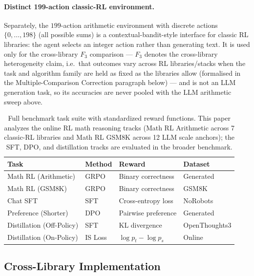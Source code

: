 \paragraph{Distinct 199-action classic-RL environment.}
Separately, the $199$-action arithmetic environment with discrete actions $\{0,\dots,198\}$ (all possible sums) is a contextual-bandit-style interface for classic RL libraries: the agent selects an integer action rather than generating text.
It is used only for the cross-library $F_3$ comparison --- $F_3$ denotes the cross-library heterogeneity claim, i.e.\ that outcomes vary across RL libraries/stacks when the task and algorithm family are held as fixed as the libraries allow (formalised in the Multiple-Comparison Correction paragraph below) --- and is not an LLM generation task, so its accuracies are never pooled with the LLM arithmetic sweep above.

\begin{table}[htbp]
\centering
\caption{Full \ours{} benchmark task suite with standardized reward functions. This paper analyzes the online RL math reasoning tracks (Math RL Arithmetic across 7 classic-RL libraries and Math RL GSM8K across 12 LLM scale anchors); the SFT, DPO, and distillation tracks are evaluated in the broader \ours{} benchmark.}
\label{tab:tasks}
\begin{tabular}{llll}
\toprule
\textbf{Task} & \textbf{Method} & \textbf{Reward} & \textbf{Dataset} \\
\midrule
Math RL (Arithmetic) & GRPO & Binary correctness & Generated \\
Math RL (GSM8K) & GRPO & Binary correctness & GSM8K \\
Chat SFT & SFT & Cross-entropy loss & NoRobots \\
Preference (Shorter) & DPO & Pairwise preference & Generated \\
Distillation (Off-Policy) & SFT & KL divergence & OpenThoughts3 \\
Distillation (On-Policy) & IS Loss & $\log p_t - \log p_s$ & Online \\
\bottomrule
\end{tabular}
\end{table}

\subsection{Cross-Library Implementation}

